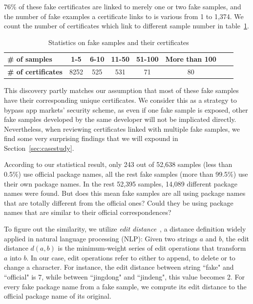 76\% of these fake certificates are linked to merely one or two fake samples, and the number of fake examples a certificate links to is various from 1 to 1,374.
We count the number of certificates which link to different sample number in table~\ref{table:certificate_number_statistic}.

\begin{table}
  \renewcommand{\arraystretch}{1}
  \footnotesize
  \centering
  \caption{Statistics on fake samples and their certificates}
  \vspace{1mm}
  \begin{tabular}{l c c c c c c c}
  \toprule
  {\bf \# of samples} & {\bf 1-5} & {\bf 6-10} & {\bf 11-50} & {\bf 51-100} & {\bf More than 100} \\
  \midrule
  {\bf \# of certificates} & 8252 & 525 & 531 & 71 & 80 \\
  \bottomrule
  \end{tabular}
  \label{table:certificate_number_statistic}
\end{table}

This discovery partly matches our assumption that most of these fake samples have their corresponding unique certificates.
We consider this as a strategy to bypass app markets' security scheme, as even if one fake sample is exposed, other fake samples developed by the same developer will not be implicated directly.
Nevertheless, when reviewing certificates linked with multiple fake samples, we find some very surprising findings that we will expound in Section~\ref{sec:casestudy}.

According to our statistical result, only 243 out of 52,638 samples (less than 0.5\%) use official package names, all the rest fake samples (more than 99.5\%) use their own package names.
In the rest 52,395 samples, 14,089 different package names were found.
But does this mean fake samples are all using package names that are totally different from the official ones? Could they be using package names that are similar to their official correspondences?

To figure out the similarity, we utilize \textit{edit distance}~\cite{levenshtein1966binary}, a distance definition widely applied in natural language processing (NLP):
{Given two strings $a$ and $b$, the edit distance $d(a, b)$ is the minimum-weight series of edit operations that transform $a$ into $b$.
In our case, edit operations refer to either to append, to delete or to change a character.}
For instance, the edit distance between string ``fake" and ``official" is 7, while between ``jingdong" and ``jindeng", this value becomes 2.
For every fake package name from a fake sample, we compute its edit distance to the official package name of its original.


